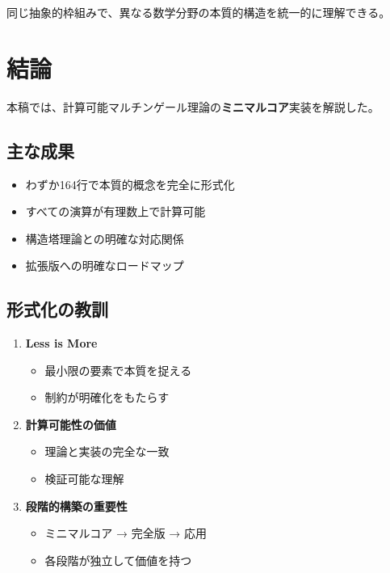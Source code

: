 \documentclass[a4paper,12pt]{ltjsarticle}
\theoremstyle{definition}
\begin{document}
同じ抽象的枠組みで、異なる数学分野の本質的構造を統一的に理解できる。

\section{結論}

本稿では、計算可能マルチンゲール理論の\textbf{ミニマルコア}実装を解説した。

\subsection{主な成果}

\begin{itemize}
\item わずか164行で本質的概念を完全に形式化
\item すべての演算が有理数上で計算可能
\item 構造塔理論との明確な対応関係
\item 拡張版への明確なロードマップ
\end{itemize}

\subsection{形式化の教訓}

\begin{enumerate}
\item \textbf{Less is More}
  \begin{itemize}
    \item 最小限の要素で本質を捉える
    \item 制約が明確化をもたらす
  \end{itemize}

\item \textbf{計算可能性の価値}
  \begin{itemize}
    \item 理論と実装の完全な一致
    \item 検証可能な理解
  \end{itemize}

\item \textbf{段階的構築の重要性}
  \begin{itemize}
    \item ミニマルコア → 完全版 → 応用
    \item 各段階が独立して価値を持つ
  \end{itemize}
\end{enumerate}

\vspace{1em}
\end{document}
